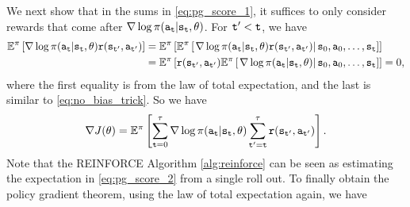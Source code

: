 We next show that in the sums in \eqref{eq:pg_score_1}, it suffices to only consider rewards that come after $\nabla\log \pi({\tt a}_{\tt t}|{\tt s}_{\tt t},\theta)$. For ${\tt t}' < {\tt t}$, we have
\begin{equation*}
\begin{split}
    \mathbb{E}^{\pi}\left[ \nabla\log \pi({\tt a}_{\tt t}|{\tt s}_{\tt t},\theta) {\tt r}({\tt s}_{{\tt t}'},{\tt a}_{{\tt t}'})\right] &= \mathbb{E}^{\pi}\left[ \mathbb{E}^{\pi}\left[\left.\nabla\log \pi({\tt a}_{\tt t}|{\tt s}_{\tt t},\theta) {\tt r}({\tt s}_{{\tt t}'},{\tt a}_{{\tt t}'})\right| {\tt s}_0,{\tt a}_0,\dots,{\tt s}_{\tt t}\right]\right] \\
    &= \mathbb{E}^{\pi}\left[ {\tt r}({\tt s}_{{\tt t}'},{\tt a}_{{\tt t}'}) \mathbb{E}^{\pi}\left[\left.\nabla\log \pi({\tt a}_{\tt t}|{\tt s}_{\tt t},\theta) \right| {\tt s}_0,{\tt a}_0,\dots,{\tt s}_{\tt t}\right]\right] = 0,
\end{split}
\end{equation*}
where the first equality is from the law of total expectation, and the last is similar to \eqref{eq:no_bias_trick}. So we have
\begin{equation}\label{eq:pg_score_2}
    \nabla J(\theta) = \mathbb{E}^{\pi}\left[ \sum_{{\tt t}=0}^\tau \nabla\log \pi({\tt a}_{\tt t}|{\tt s}_{\tt t},\theta) \sum_{{\tt t}'={\tt t}}^\tau {\tt r}({\tt s}_{{\tt t}'},{\tt a}_{{\tt t}'})\right].
\end{equation}
Note that the REINFORCE Algorithm \ref{alg:reinforce} can be seen as estimating the expectation in \eqref{eq:pg_score_2} from a single roll out. To finally obtain the policy gradient theorem, using the law of total expectation again, we have
